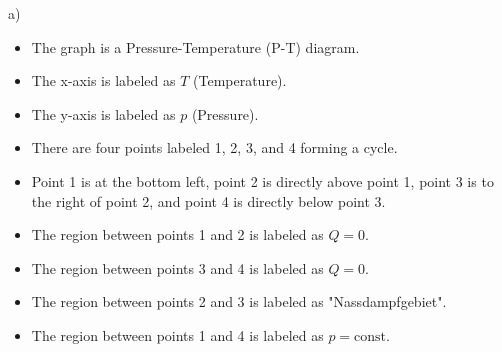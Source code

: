 a)

\begin{itemize}
    \item The graph is a Pressure-Temperature (P-T) diagram.
    \item The x-axis is labeled as $T$ (Temperature).
    \item The y-axis is labeled as $p$ (Pressure).
    \item There are four points labeled 1, 2, 3, and 4 forming a cycle.
    \item Point 1 is at the bottom left, point 2 is directly above point 1, point 3 is to the right of point 2, and point 4 is directly below point 3.
    \item The region between points 1 and 2 is labeled as $Q = 0$.
    \item The region between points 3 and 4 is labeled as $Q = 0$.
    \item The region between points 2 and 3 is labeled as "Nassdampfgebiet".
    \item The region between points 1 and 4 is labeled as $p = \text{const}$.
\end{itemize}